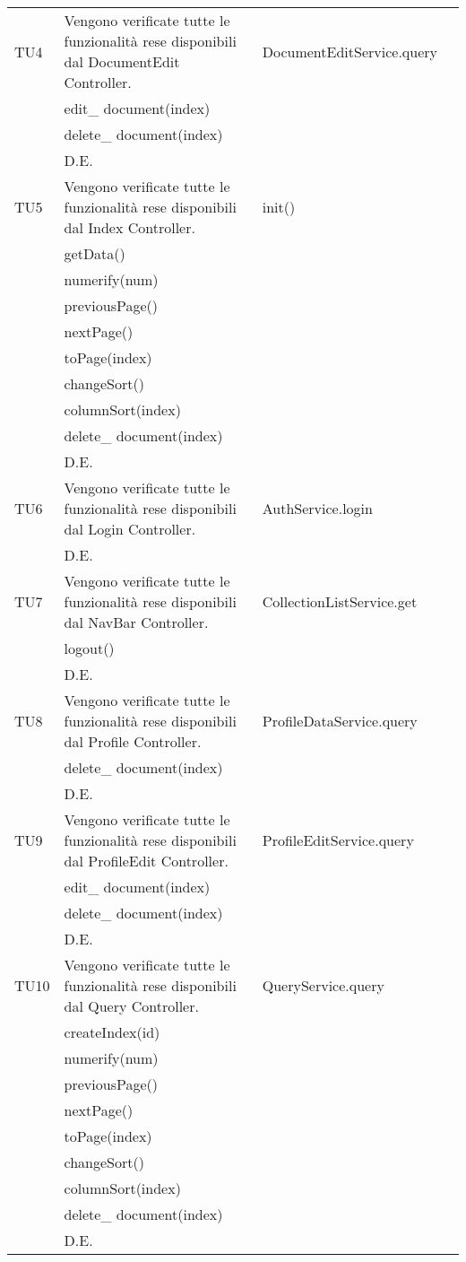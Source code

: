 \begin{center}
\begin{longtable}{|p{2cm}|p{7cm}|p{7cm}|p{2cm}|}
\midrule
TU4
& Vengono verificate tutte le funzionalità rese disponibili dal DocumentEdit Controller.
& DocumentEditService.query\\
& edit\_ document(index)\\
& delete\_ document(index)\\
& D.E.\\


\midrule
TU5
& Vengono verificate tutte le funzionalità rese disponibili dal Index Controller.
& init()\\
& getData()\\
& numerify(num)\\
& previousPage()\\
& nextPage()\\
& toPage(index)\\
& changeSort()\\
& columnSort(index)\\
& delete\_ document(index)\\
& D.E.\\



\midrule
TU6
& Vengono verificate tutte le funzionalità rese disponibili dal Login Controller.
& AuthService.login\\
& D.E.\\


\midrule
TU7
& Vengono verificate tutte le funzionalità rese disponibili dal NavBar Controller.
& CollectionListService.get\\
& logout()\\
& D.E.\\


\midrule
TU8
& Vengono verificate tutte le funzionalità rese disponibili dal Profile Controller.
& ProfileDataService.query\\
& delete\_ document(index)\\
& D.E.\\

\midrule
TU9
& Vengono verificate tutte le funzionalità rese disponibili dal ProfileEdit Controller.
& ProfileEditService.query\\
& edit\_ document(index)\\
& delete\_ document(index)\\
& D.E.\\


\midrule
TU10
& Vengono verificate tutte le funzionalità rese disponibili dal Query Controller.
& QueryService.query\\
& createIndex(id)\\
& numerify(num)\\
& previousPage()\\
& nextPage()\\
& toPage(index)\\
& changeSort()\\
& columnSort(index)\\
& delete\_ document(index)\\
& D.E.\\



\end{longtable}
\end{center}
